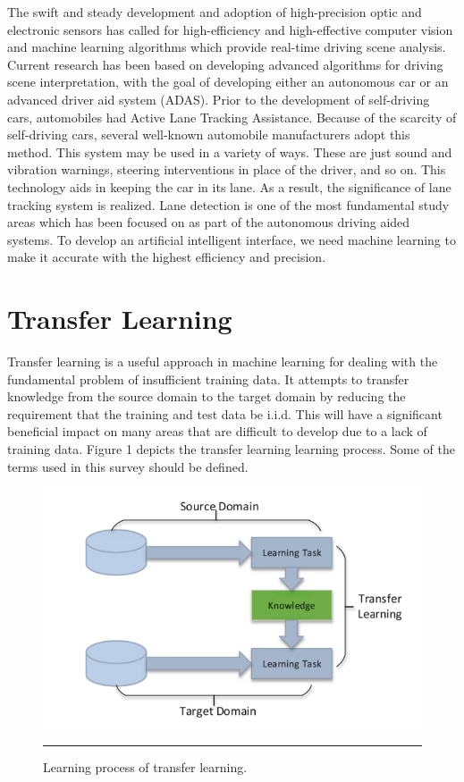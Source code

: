 The swift and steady development and adoption of high-precision optic and electronic sensors has called for high-efficiency and high-effective computer vision and machine learning algorithms which provide real-time driving scene analysis. Current research has been based on developing advanced algorithms for driving scene interpretation, with the goal of developing either an autonomous car or an advanced driver aid system (ADAS). Prior to the development of self-driving cars, automobiles had Active Lane Tracking Assistance. Because of the scarcity of self-driving cars, several well-known automobile manufacturers adopt this method. This system may be used in a variety of ways. These are just sound and vibration warnings, steering interventions in place of the driver, and so on. This technology aids in keeping the car in its lane. As a result, the significance of lane tracking system is realized.\cite{kamci_lane_2019} Lane detection is one of the most fundamental study areas which has been focused on as part of the autonomous driving aided systems. To develop an artificial intelligent interface, we need machine learning to make it accurate with the highest efficiency and precision. \cite{zou_robust_2020} 




\section{Transfer Learning}

Transfer learning is a useful approach in machine learning for dealing with the fundamental problem of  insufficient training data. It attempts to transfer knowledge from the source domain to the target domain by reducing the requirement that the training and test data be i.i.d. This will have a significant beneficial impact on many areas that are difficult to develop due to a lack of training data. Figure 1 depicts the transfer learning learning process. Some of the terms used in this survey should be defined.


\begin{figure}[htbp]
	\centering
		\includegraphics[scale=0.5]{Figures/process1.png}
		\rule{35em}{0.5pt}
	\caption[The Transfer Learning Process]{Learning process of transfer learning.}
	\label{fig:Transfer Learning Process}
\end{figure}


